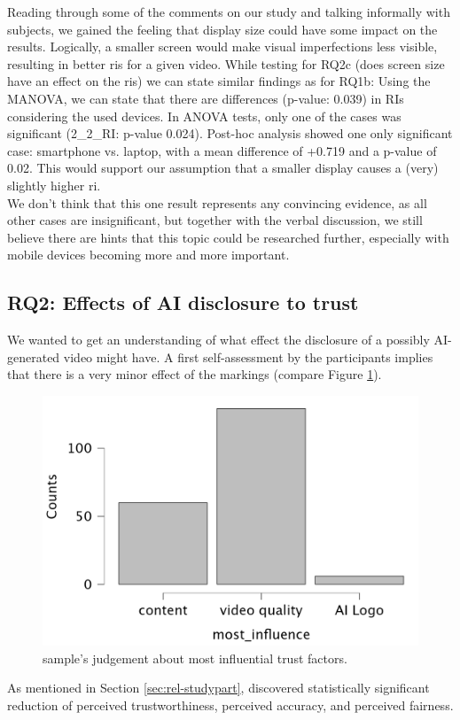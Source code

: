\documentclass[
  a4paper,  %
  twoside,  %
  bibliography=totoc,
  headsepline,
  cleardoublepage=empty,
  parskip=half,
  draft=false
]{scrbook}
\begin{document}
Reading through some of the comments on our study and talking informally with subjects, we gained the feeling that display size could have some impact on the results. Logically, a smaller screen would make visual imperfections less visible, resulting in better \gls{ri}s for a given video. While testing for RQ2c (does screen size have an effect on the \gls{ri}s) we can state similar findings as for RQ1b: Using the MANOVA, we can state that there are differences (p-value: 0.039) in RIs considering the used devices.
In ANOVA tests, only one of the cases was significant (2\_2\_RI: p-value 0.024). Post-hoc analysis showed one only significant case: smartphone vs. laptop, with a mean difference of +0.719 and a p-value of 0.02. This would support our assumption that a smaller display causes a (very) slightly higher \gls{ri}. \\
We don't think that this one result represents any convincing evidence, as all other cases are insignificant, but together with the verbal discussion, we still believe there are hints that this topic could be researched further, especially with mobile devices becoming more and more important.

\subsection{RQ2: Effects of AI disclosure to trust}
\label{subsec:RQ2}
We wanted to get an understanding of what effect the disclosure of a possibly AI-generated video might have. A first self-assessment by the participants implies that there is a very minor effect of the markings (compare Figure \ref{fig:most-influence}).
\begin{figure}[h]
  \centering
  \includegraphics[width=.5\textwidth]{graphics/images/statistics/most-influence.png}
  \caption{sample's judgement about most influential trust factors.}
  \label{fig:most-influence}
\end{figure}
As mentioned in Section \ref{sec:rel-studypart},  discovered statistically significant reduction of perceived trustworthiness, perceived accuracy, and perceived fairness. 
\end{document}
